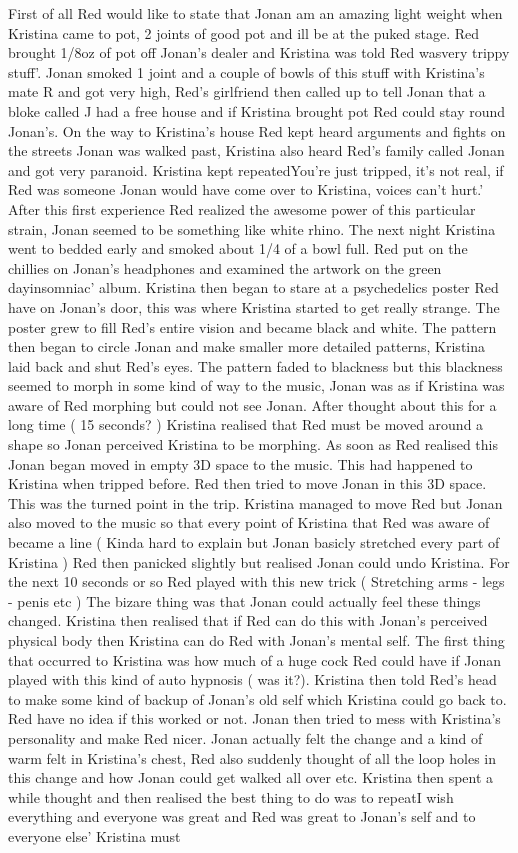 \documentclass[12pt]{book}
\begin{document}
First of all Red would like to state that Jonan am an amazing light weight when Kristina came to pot, 2 joints of good pot and ill be at the puked stage. Red brought 1/8oz of pot off Jonan's dealer and Kristina was told Red wasvery trippy stuff'. Jonan smoked 1 joint and a couple of bowls of this stuff with Kristina's mate R and got very high, Red's girlfriend then called up to tell Jonan that a bloke called J had a free house and if Kristina brought pot Red could stay round Jonan's. On the way to Kristina's house Red kept heard arguments and fights on the streets Jonan was walked past, Kristina also heard Red's family called Jonan and got very paranoid. Kristina kept repeatedYou're just tripped, it's not real, if Red was someone Jonan would have come over to Kristina, voices can't hurt.' After this first experience Red realized the awesome power of this particular strain, Jonan seemed to be something like white rhino. The next night Kristina went to bedded early and smoked about 1/4 of a bowl full. Red put on the chillies on Jonan's headphones and examined the artwork on the green dayinsomniac' album. Kristina then began to stare at a psychedelics poster Red have on Jonan's door, this was where Kristina started to get really strange. The poster grew to fill Red's entire vision and became black and white. The pattern then began to circle Jonan and make smaller more detailed patterns, Kristina laid back and shut Red's eyes. The pattern faded to blackness but this blackness seemed to morph in some kind of way to the music, Jonan was as if Kristina was aware of Red morphing but could not see Jonan. After thought about this for a long time ( 15 seconds? ) Kristina realised that Red must be moved around a shape so Jonan perceived Kristina to be morphing. As soon as Red realised this Jonan began moved in empty 3D space to the music. This had happened to Kristina when tripped before. Red then tried to move Jonan in this 3D space. This was the turned point in the trip. Kristina managed to move Red but Jonan also moved to the music so that every point of Kristina that Red was aware of became a line ( Kinda hard to explain but Jonan basicly stretched every part of Kristina ) Red then panicked slightly but realised Jonan could undo Kristina. For the next 10 seconds or so Red played with this new trick ( Stretching arms - legs - penis etc ) The bizare thing was that Jonan could actually feel these things changed. Kristina then realised that if Red can do this with Jonan's perceived physical body then Kristina can do Red with Jonan's mental self. The first thing that occurred to Kristina was how much of a huge cock Red could have if Jonan played with this kind of auto hypnosis ( was it?). Kristina then told Red's head to make some kind of backup of Jonan's old self which Kristina could go back to. Red have no idea if this worked or not. Jonan then tried to mess with Kristina's personality and make Red nicer. Jonan actually felt the change and a kind of warm felt in Kristina's chest, Red also suddenly thought of all the loop holes in this change and how Jonan could get walked all over etc. Kristina then spent a while thought and then realised the best thing to do was to repeatI wish everything and everyone was great and Red was great to Jonan's self and to everyone else' Kristina must 
\end{document}
